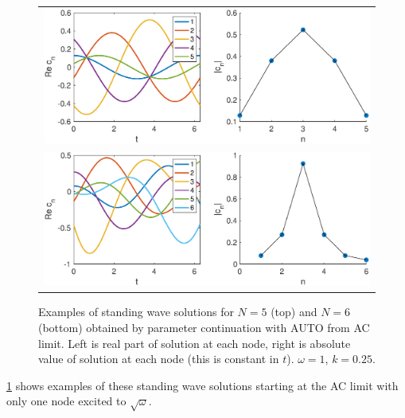 \documentclass[12pt]{article}
\def\noi{\noindent}
\begin{document}
\begin{figure}[H]
\begin{center}
\begin{tabular}{c}
\includegraphics[width=12cm]{images/twist5.eps} \\
\includegraphics[width=12cm]{images/twist6.eps}
\end{tabular}
\end{center}
\caption{Examples of standing wave solutions for $N = 5$ (top) and $N = 6$ (bottom) obtained by parameter continuation with AUTO from AC limit. Left is real part of solution at each node, right is absolute value of solution at each node (this is constant in $t$). $\omega = 1$, $k = 0.25$.}
\label{fig:twist1}
\end{figure}
\noi \cref{fig:twist1} shows examples of these standing wave solutions starting at the AC limit with only one node excited to $\sqrt{\omega}$.
\end{document}

